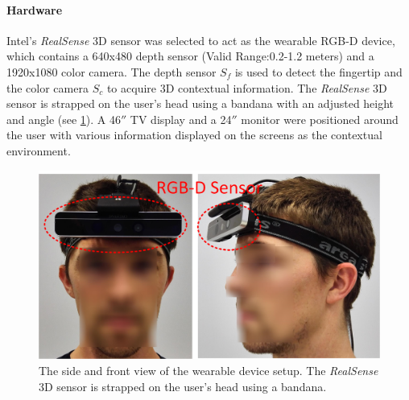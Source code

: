 \paragraph{Hardware}
Intel{\rq}s \textit{RealSense} 3D sensor  was selected to act as the wearable RGB-D device, which contains a 640x480 depth sensor (Valid Range:0.2-1.2 meters) and a 1920x1080 color camera. The depth sensor $S_f$ is used to detect the fingertip  and the color camera $S_c$ to acquire 3D contextual information. The \textit{RealSense} 3D sensor is strapped on the user{\rq}s head using a bandana with an adjusted height and angle (see \figurename{ \ref{fig:3-PAST:hardWare}}). 
A 46$''$ TV display and a 24$''$ monitor were positioned around the user with various information displayed on the screens as the contextual environment. 
\begin{figure}[htb]
	\centering
	\includegraphics[width = \linewidth]{figures/3-PAST/hardWare.png}
	\caption{The side and front view of the wearable device setup. The \textit{RealSense} 3D sensor is strapped on the user{\rq}s head using a bandana.}
	\label{fig:3-PAST:hardWare}
\end{figure}
